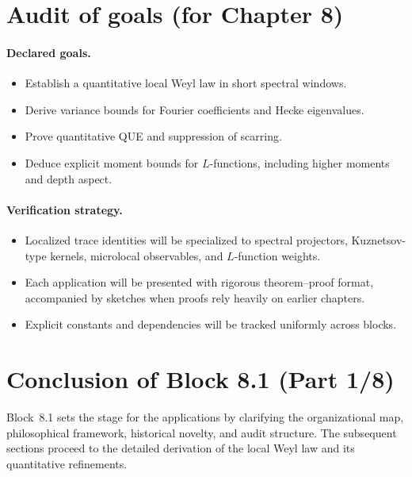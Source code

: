 \section{Audit of goals (for Chapter 8)}

\paragraph{Declared goals.}
\begin{itemize}
\item[(G8.1)] Establish a quantitative local Weyl law in short spectral windows.  
\item[(G8.2)] Derive variance bounds for Fourier coefficients and Hecke eigenvalues.  
\item[(G8.3)] Prove quantitative QUE and suppression of scarring.  
\item[(G8.4)] Deduce explicit moment bounds for $L$-functions, including higher moments and depth aspect.  
\end{itemize}

\paragraph{Verification strategy.}
\begin{itemize}
\item Localized trace identities will be specialized to spectral projectors, Kuznetsov-type kernels, microlocal observables, and $L$-function weights.  
\item Each application will be presented with rigorous theorem–proof format, accompanied by sketches when proofs rely heavily on earlier chapters.  
\item Explicit constants and dependencies will be tracked uniformly across blocks.  
\end{itemize}

\section{Conclusion of Block 8.1 (Part 1/8)}

Block~8.1 sets the stage for the applications by clarifying the organizational map, philosophical framework, historical novelty, and audit structure. The subsequent sections proceed to the detailed derivation of the local Weyl law and its quantitative refinements.


